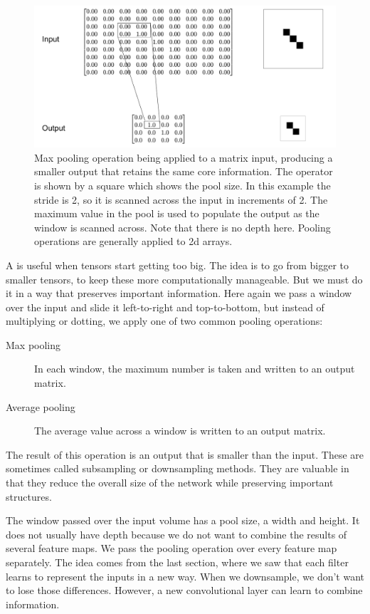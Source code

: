 \begin{figure}[h]
\centering
\includegraphics[scale=.3]{./images/maxPooling.png}
\caption[Jeff Yoshimi ]{Max pooling operation being applied to a matrix input, producing a smaller output that retains the same core information. The operator is shown by a square which shows the pool size. In this example the stride is 2, so it is scanned across the input in increments of 2. The maximum value in the pool is used to populate the output as the window is scanned across. Note that there is no depth here. Pooling operations are generally applied to 2d arrays.}
\label{maxPooling}
\end{figure}

A  is useful when tensors start getting too big. The idea is to go from bigger to smaller tensors, to keep these more computationally manageable. But we must do it in a way that preserves important information. Here again we pass a window over the input and slide it left-to-right and top-to-bottom, but instead of multiplying or dotting, we apply one of two common pooling operations:

\begin{description}
\item[Max pooling] In each window, the maximum number is taken and written to an output matrix.
\item[Average pooling] The average value across a window is written to an output matrix.
\end{description}
The result of this operation is an output that is smaller than the input. These are sometimes called subsampling or downsampling methods. They are valuable in that they reduce the overall size of the network while preserving important structures.

The window passed over the input volume has a pool size, a width and height. It does not usually have depth because we do not want to combine the results of several feature maps. We pass the pooling operation over every feature map separately. The idea comes from the last section, where we saw that each filter learns to represent the inputs in a new way. When we downsample, we don't want to lose those differences. However, a new convolutional layer can learn to combine information.

